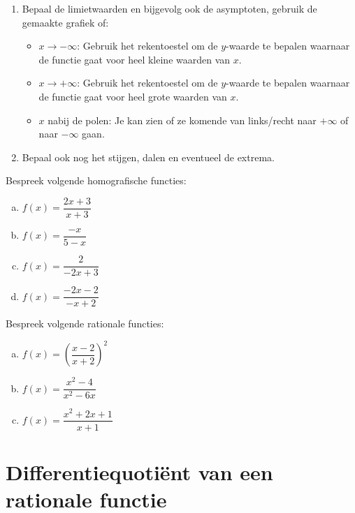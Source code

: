 \documentclass[12pt]{article}
\begin{document}
\begin{enumerate}
  \item Bepaal de limietwaarden en bijgevolg ook de asymptoten, gebruik de gemaakte grafiek of:
  \begin{itemize}
  \scriptsize
    \item $x\to-\infty$: Gebruik het rekentoestel om de $y$-waarde te bepalen waarnaar de functie gaat voor heel kleine waarden van $x$.
    \item $x\to+\infty$: Gebruik het rekentoestel om de $y$-waarde te bepalen waarnaar de functie gaat voor heel grote waarden van $x$.
    \item $x$ nabij de polen: Je kan zien of ze komende van links/recht naar $+\infty$ of naar $-\infty$ gaan.
  \end{itemize}
  \item Bepaal ook nog het stijgen, dalen en eventueel de extrema.
\end{enumerate}

\begin{oefening}
Bespreek volgende homografische functies:\\
\begin{enumerate}[(a)]
  \itemsep1em
  \item $f(x)=\dfrac{2x+3}{x+3}$
  \item $f(x)=\dfrac{-x}{5-x}$
  \item $f(x)=\dfrac{2}{-2x+3}$
  \item $f(x)=\dfrac{-2x-2}{-x+2}$
\end{enumerate}
\end{oefening}

\begin{oefening}
Bespreek volgende rationale functies:\\
\begin{enumerate}[(a)]
  \itemsep1em
  \item $f(x)=\left(\dfrac{x-2}{x+2}\right)^2$
  \item $f(x)=\dfrac{x^2-4}{x^2-6x}$
  \item $f(x)=\dfrac{x^2+2x+1}{x+1}$
\end{enumerate}
\end{oefening}

\pagebreak
\section{Differentiequotiënt van een rationale functie}
\end{document}
